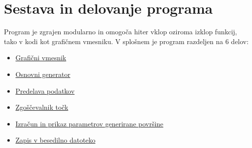\documentclass[a4paper,twoside,openright,12pt,slovene]{book}
\begin{document}
\section{Sestava in delovanje programa}

Program je zgrajen modularno in omogoča hiter vklop oziroma izklop funkcij, tako v kodi kot grafičnem vmesniku. V splošnem je program razdeljen na 6 delov:

\begin{itemize}
    \setlength\itemsep{0.1em}
    \item \hyperref[gui]{Grafični vmesnik}
    \item \hyperref[osnovniGenerator]{Osnovni generator}
    \item \hyperref[predelavaPodatkov]{Predelava podatkov}
    \item \hyperref[zgoščevalnikTočk]{Zgoščevalnik točk} 
    \item \hyperref[izračunInPrikaz]{Izračun in prikaz parametrov generirane površine}
    \item \hyperref[zapisVBesedilo]{Zapis v besedilno datoteko}
\end{itemize}
\end{document}
